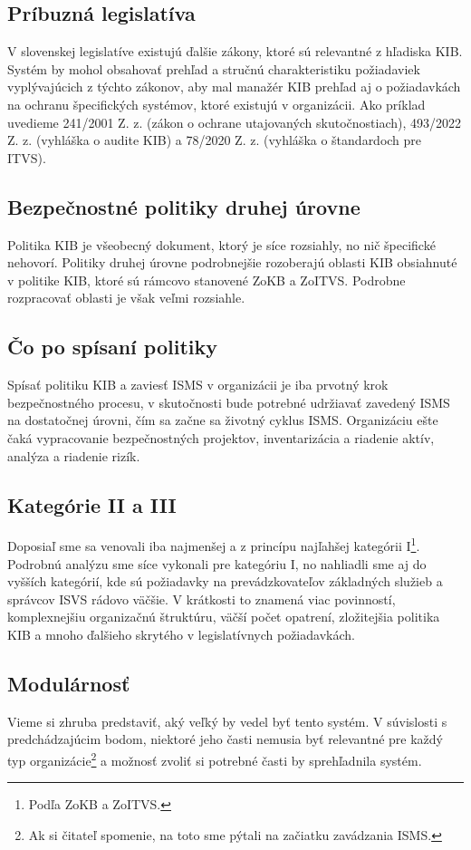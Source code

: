 \subsection*{Príbuzná legislatíva}
V slovenskej legislatíve existujú ďalšie zákony, ktoré sú relevantné z hľadiska KIB. Systém by mohol obsahovať prehľad a
stručnú charakteristiku požiadaviek vyplývajúcich z týchto zákonov, aby mal manažér KIB prehľad aj o požiadavkách na
ochranu špecifických systémov, ktoré existujú v organizácii. Ako príklad uvedieme 241/2001 Z. z. (zákon o ochrane
utajovaných skutočnostiach), 493/2022 Z. z. (vyhláška o audite KIB) a 78/2020 Z. z. (vyhláška o štandardoch pre ITVS).

\subsection*{Bezpečnostné politiky druhej úrovne}
Politika KIB je všeobecný dokument, ktorý je síce rozsiahly, no nič špecifické nehovorí. Politiky druhej úrovne podrobnejšie
rozoberajú oblasti KIB obsiahnuté v politike KIB, ktoré sú rámcovo stanovené ZoKB a ZoITVS. Podrobne rozpracovať oblasti
je však veľmi rozsiahle.

\subsection*{Čo po spísaní politiky}
Spísať politiku KIB a zaviesť ISMS v organizácii je iba prvotný krok bezpečnostného procesu, v skutočnosti bude potrebné
udržiavať zavedený ISMS na dostatočnej úrovni, čím sa začne sa životný cyklus ISMS. Organizáciu ešte čaká vypracovanie bezpečnostných
projektov, inventarizácia a riadenie aktív, analýza a riadenie rizík.

\subsection*{Kategórie II a III}
Doposiaľ sme sa venovali iba najmenšej a z princípu najľahšej kategórii I\footnote{Podľa ZoKB a ZoITVS.}. Podrobnú
analýzu sme síce vykonali pre kategóriu I, no nahliadli sme aj do vyšších kategórií, kde sú požiadavky na
prevádzkovateľov základných služieb a správcov ISVS rádovo väčšie. V krátkosti to znamená viac povinností, komplexnejšiu
organizačnú štruktúru, väčší počet opatrení, zložitejšia politika KIB a mnoho ďalšieho skrytého v legislatívnych
požiadavkách.

\subsection*{Modulárnosť}
Vieme si zhruba predstaviť, aký veľký by vedel byť tento systém. V súvislosti s predchádzajúcim bodom, niektoré jeho časti
nemusia byť relevantné pre každý typ organizácie\footnote{Ak si čitateľ spomenie, na toto sme  pýtali na začiatku zavádzania
ISMS.} a možnosť zvoliť si potrebné časti by sprehľadnila systém.


